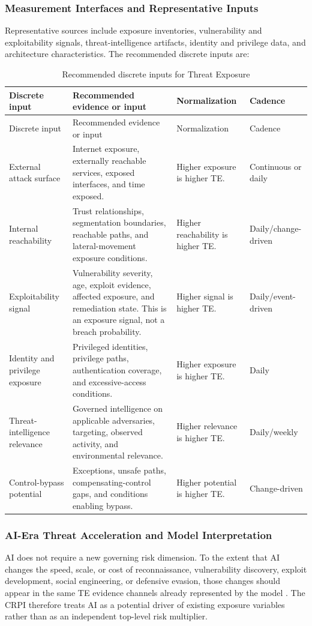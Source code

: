 \documentclass[11pt]{article}
\begin{document}
\subsubsection{Measurement Interfaces and Representative Inputs}
Representative sources include exposure inventories, vulnerability and exploitability
signals, threat-intelligence artifacts, identity and privilege data, and architecture
characteristics. The recommended discrete inputs are:

\begin{longtable}{P{0.18\textwidth} P{0.35\textwidth} P{0.18\textwidth} P{0.17\textwidth}}
  \caption{Recommended discrete inputs for Threat Exposure}\\
  \toprule
  Discrete input & Recommended evidence or input & Normalization & Cadence \\
  \midrule
  \endfirsthead
  \toprule
  Discrete input & Recommended evidence or input & Normalization & Cadence \\
  \midrule
  \endhead
  External attack surface & Internet exposure, externally reachable services, exposed interfaces, and time exposed. & Higher exposure is higher TE. & Continuous or daily \\
  Internal reachability & Trust relationships, segmentation boundaries, reachable paths, and lateral-movement exposure conditions. & Higher reachability is higher TE. & Daily/change-driven \\
  Exploitability signal & Vulnerability severity, age, exploit evidence, affected exposure, and remediation state. This is an exposure signal, not a breach probability. & Higher signal is higher TE. & Daily/event-driven \\
  Identity and privilege exposure & Privileged identities, privilege paths, authentication coverage, and excessive-access conditions. & Higher exposure is higher TE. & Daily \\
  Threat-intelligence relevance & Governed intelligence on applicable adversaries, targeting, observed activity, and environmental relevance. & Higher relevance is higher TE. & Daily/weekly \\
  Control-bypass potential & Exceptions, unsafe paths, compensating-control gaps, and conditions enabling bypass. & Higher potential is higher TE. & Change-driven \\
  \bottomrule
\end{longtable}

\subsubsection{AI-Era Threat Acceleration and Model Interpretation}
AI does not require a new governing risk dimension. To the extent that AI changes the
speed, scale, or cost of reconnaissance, vulnerability discovery, exploit development,
social engineering, or defensive evasion, those changes should appear in the same TE
evidence channels already represented by the model \cite{nist-ai-rmf,cisa-ai-roadmap}.
The CRPI therefore treats AI as a potential driver of existing exposure variables rather
than as an independent top-level risk multiplier.
\end{document}
